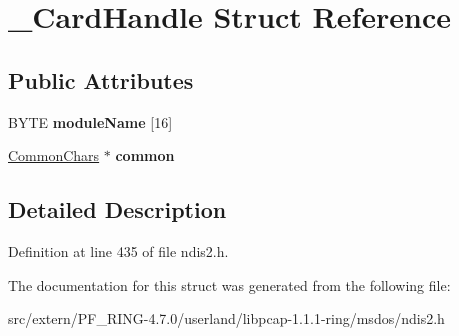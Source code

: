 \hypertarget{struct___card_handle}{
\section{\_\-CardHandle Struct Reference}
\label{struct___card_handle}
}
\subsection*{Public Attributes}
\begin{DoxyCompactItemize}
\item 
\hypertarget{struct___card_handle_ab1eaee06df0386ddc55e4a309c62612c}{
BYTE {\bfseries moduleName} \mbox{[}16\mbox{]}}
\label{struct___card_handle_ab1eaee06df0386ddc55e4a309c62612c}

\item 
\hypertarget{struct___card_handle_a1a0e66e096bdee29e2a6818aa747dd66}{
\hyperlink{struct___common_chars}{CommonChars} $\ast$ {\bfseries common}}
\label{struct___card_handle_a1a0e66e096bdee29e2a6818aa747dd66}

\end{DoxyCompactItemize}


\subsection{Detailed Description}


Definition at line 435 of file ndis2.h.



The documentation for this struct was generated from the following file:\begin{DoxyCompactItemize}
\item 
src/extern/PF\_\-RING-\/4.7.0/userland/libpcap-\/1.1.1-\/ring/msdos/ndis2.h\end{DoxyCompactItemize}
